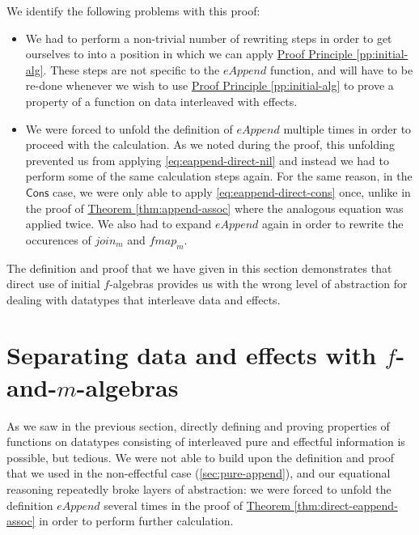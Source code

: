 \documentclass{jfp1}
\newcommand{\proofprinref}[1]{\hyperref[#1]{Proof Principle \ref*{#1}}}
\newcommand{\thmref}[1]{\hyperref[#1]{Theorem \ref*{#1}}}
\begin{document}
We identify the following problems with this proof:
\begin{itemize}
\item We had to perform a non-trivial number of rewriting steps in
  order to get ourselves to into a position in which we can apply
  \proofprinref{pp:initial-alg}. These steps are not specific to the
  $\mathit{eAppend}$ function, and will have to be re-done whenever we
  wish to use \proofprinref{pp:initial-alg} to prove a property of a
  function on data interleaved with effects.
\item We were forced to unfold the definition of $\mathit{eAppend}$
  multiple times in order to proceed with the calculation. As we noted
  during the proof, this unfolding prevented us from applying
  \autoref{eq:eappend-direct-nil} and instead we had to perform some
  of the same calculation steps again. For the same reason, in the
  $\mathsf{Cons}$ case, we were only able to apply
  \autoref{eq:eappend-direct-cons} once, unlike in the proof of
  \thmref{thm:append-assoc} where the analogous equation was applied
  twice. We also had to expand $\mathit{eAppend}$ again in order to
  rewrite the occurences of $\mathit{join_m}$ and $\mathit{fmap_m}$.
\end{itemize}
The definition and proof that we have given in this section
demonstrates that direct use of initial $f$-algebras provides us with
the wrong level of abstraction for dealing with datatypes that
interleave data and effects.

\section{Separating data and effects with \texorpdfstring{$f$}{f}-and-\texorpdfstring{$m$}{m}-algebras}
\label{sec:f-and-m-algebras}

As we saw in the previous section, directly defining and proving
properties of functions on datatypes consisting of interleaved pure
and effectful information is possible, but tedious. We were not able
to build upon the definition and proof that we used in the
non-effectful case (\autoref{sec:pure-append}), and our equational
reasoning repeatedly broke layers of abstraction: we were forced to
unfold the definition $\mathit{eAppend}$ several times in the proof of
\thmref{thm:direct-eappend-assoc} in order to perform further
calculation.
\end{document}
